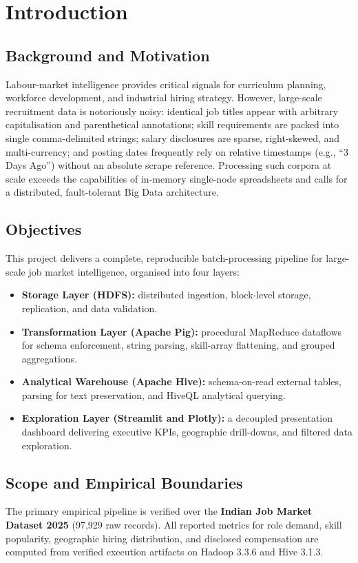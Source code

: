 \documentclass[10pt,a4paper]{article}
\newcommand{\code}[1]{\texttt{\small\detokenize{#1}}}
\begin{document}
\section{Introduction}

\subsection{Background and Motivation}
Labour-market intelligence provides critical signals for curriculum planning, workforce development, and industrial hiring strategy. However, large-scale recruitment data is notoriously noisy: identical job titles appear with arbitrary capitalisation and parenthetical annotations; skill requirements are packed into single comma-delimited strings; salary disclosures are sparse, right-skewed, and multi-currency; and posting dates frequently rely on relative timestamps (e.g., ``3 Days Ago'') without an absolute scrape reference. Processing such corpora at scale exceeds the capabilities of in-memory single-node spreadsheets and calls for a distributed, fault-tolerant Big Data architecture.

\subsection{Objectives}
This project delivers a complete, reproducible batch-processing pipeline for large-scale job market intelligence, organised into four layers:
\begin{itemize}
  \item \textbf{Storage Layer (HDFS):} distributed ingestion, block-level storage, replication, and data validation.
  \item \textbf{Transformation Layer (Apache Pig):} procedural MapReduce dataflows for schema enforcement, string parsing, skill-array flattening, and grouped aggregations.
  \item \textbf{Analytical Warehouse (Apache Hive):} schema-on-read external tables, \code{OpenCSVSerde} parsing for text preservation, and HiveQL analytical querying.
  \item \textbf{Exploration Layer (Streamlit and Plotly):} a decoupled presentation dashboard delivering executive KPIs, geographic drill-downs, and filtered data exploration.
\end{itemize}

\subsection{Scope and Empirical Boundaries}
The primary empirical pipeline is verified over the \textbf{Indian Job Market Dataset 2025} (97,929 raw records). All reported metrics for role demand, skill popularity, geographic hiring distribution, and disclosed compensation are computed from verified execution artifacts on Hadoop 3.3.6 and Hive 3.1.3.
\end{document}
